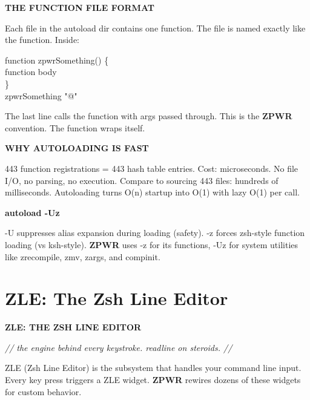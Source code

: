 \documentclass[11pt,a4paper,twoside]{book}
\begin{document}
\vspace{12pt}
{\bfseries\color{neonyellow} THE FUNCTION FILE FORMAT}\vspace{4pt}

Each file in the autoload dir contains one function. The file is named exactly like the function. Inside:

\begin{codebox}
\color{neongreen}function zpwrSomething() \{\\
\color{neongreen}{\char`\#} function body\\
\color{neongreen}\}\\
\color{neongreen}zpwrSomething "@"\\
\end{codebox}

The last line calls the function with args passed through. This is the \textbf{ZPWR} convention. The function wraps itself.


\vspace{12pt}
{\bfseries\color{neonyellow} WHY AUTOLOADING IS FAST}\vspace{4pt}

443 function registrations = 443 hash table entries. Cost: microseconds. No file I/O, no parsing, no execution. Compare to sourcing 443 files: hundreds of milliseconds. Autoloading turns O(n) startup into O(1) with lazy O(1) per call.


\vspace{12pt}
{\bfseries\color{neonyellow} autoload -Uz}\vspace{4pt}

-U suppresses alias expansion during loading (safety). -z forces zsh-style function loading (vs ksh-style). \textbf{ZPWR} uses -z for its functions, -Uz for system utilities like zrecompile, zmv, zargs, and compinit.


\vspace{16pt}

\section{ZLE: The Zsh Line Editor}


\vspace{10pt}
{\large\bfseries\color{neoncyan} ZLE: THE ZSH LINE EDITOR}\vspace{6pt}

{\small\itshape\color{dimtext} // the engine behind every keystroke. readline on steroids. //}

ZLE (Zsh Line Editor) is the subsystem that handles your command line input. Every key press triggers a ZLE widget. \textbf{ZPWR} rewires dozens of these widgets for custom behavior.
\end{document}

